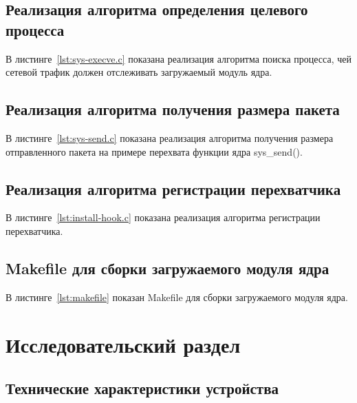 \documentclass{bmstu}
\begin{document}

\section{Реализация алгоритма определения целевого процесса}

В листинге~\ref{lst:sys-execve.c} показана реализация алгоритма поиска процесса, чей сетевой трафик должен отслеживать загружаемый модуль ядра.


\section{Реализация алгоритма получения размера пакета}

В листинге~\ref{lst:sys-send.c} показана реализация алгоритма получения размера отправленного пакета на примере перехвата функции ядра sys\_send().


\section{Реализация алгоритма регистрации перехватчика}

В листинге~\ref{lst:install-hook.c} показана реализация алгоритма регистрации перехватчика.


\section{Makefile для сборки загружаемого модуля ядра}

В листинге~\ref{lst:makefile} показан Makefile для сборки загружаемого модуля ядра.


\chapter{Исследовательский раздел}

\section{Технические характеристики устройства}
\end{document}
